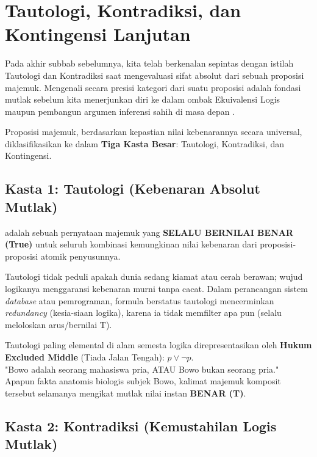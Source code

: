 \section{Tautologi, Kontradiksi, dan Kontingensi Lanjutan}

Pada akhir subbab sebelumnya, kita telah berkenalan sepintas dengan istilah Tautologi dan Kontradiksi saat mengevaluasi sifat absolut dari sebuah proposisi majemuk. Mengenali secara presisi kategori dari suatu proposisi adalah fondasi mutlak sebelum kita menerjunkan diri ke dalam ombak Ekuivalensi Logis maupun pembangun argumen inferensi sahih di masa depan \cite{rosen2019}. 

Proposisi majemuk, berdasarkan kepastian nilai kebenarannya secara universal, diklasifikasikan ke dalam \textbf{Tiga Kasta Besar}: Tautologi, Kontradiksi, dan Kontingensi.

\subsection{Kasta 1: Tautologi (Kebenaran Absolut Mutlak)}

\begin{definisi}[Tautologi]
 adalah sebuah pernyataan majemuk yang \textbf{SELALU BERNILAI BENAR (True)} untuk seluruh kombinasi kemungkinan nilai kebenaran dari proposisi-proposisi atomik penyusunnya.
\end{definisi}

Tautologi tidak peduli apakah dunia sedang kiamat atau cerah berawan; wujud logikanya menggaransi kebenaran murni tanpa cacat. Dalam perancangan sistem \textit{database} atau pemrograman, formula berstatus tautologi mencerminkan \textit{redundancy} (kesia-siaan logika), karena ia tidak memfilter apa pun (selalu meloloskan arus/bernilai T).

\begin{contoh}
Tautologi paling elemental di alam semesta logika direpresentasikan oleh \textbf{Hukum Excluded Middle} (Tiada Jalan Tengah): $p \vee \neg p$. \\
"Bowo adalah seorang mahasiswa pria, ATAU Bowo bukan seorang pria." \\
Apapun fakta anatomis biologis subjek Bowo, kalimat majemuk komposit tersebut selamanya mengikat mutlak nilai instan \textbf{BENAR (T)}.
\end{contoh}

\subsection{Kasta 2: Kontradiksi (Kemustahilan Logis Mutlak)}

